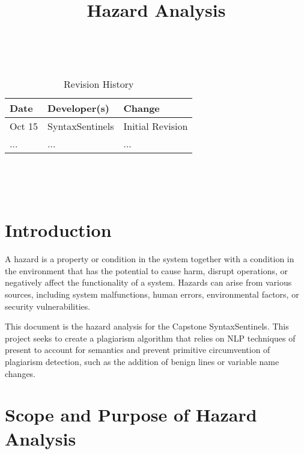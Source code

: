 \documentclass{article}
\title{Hazard Analysis\\\progname}
\author{\authname}
\date{}
\begin{document}
\maketitle
\thispagestyle{empty}

~\newpage


\begin{table}[hp]
\caption{Revision History} \label{TblRevisionHistory}
\begin{tabularx}{\textwidth}{llX}
\toprule
\textbf{Date} & \textbf{Developer(s)} & \textbf{Change}\\
\midrule
Oct 15 & SyntaxSentinels & Initial Revision\\
... & ... & ...\\
\bottomrule
\end{tabularx}
\end{table}

~\newpage

\tableofcontents

~\newpage



\section{Introduction}

A hazard is a property or condition in the system together with a condition in the environment that has the potential to cause harm, disrupt operations, 
or negatively affect the functionality of a system. Hazards can arise from various sources, including system 
malfunctions, human errors, environmental factors, or security vulnerabilities.

This document is the hazard analysis for the Capstone SyntaxSentinels. This project seeks to create a plagiarism algorithm that relies on NLP
techniques of present to account for semantics and prevent primitive circumvention of plagiarism detection, such as the addition of benign lines or
variable name changes.

\section{Scope and Purpose of Hazard Analysis}

\end{document}
